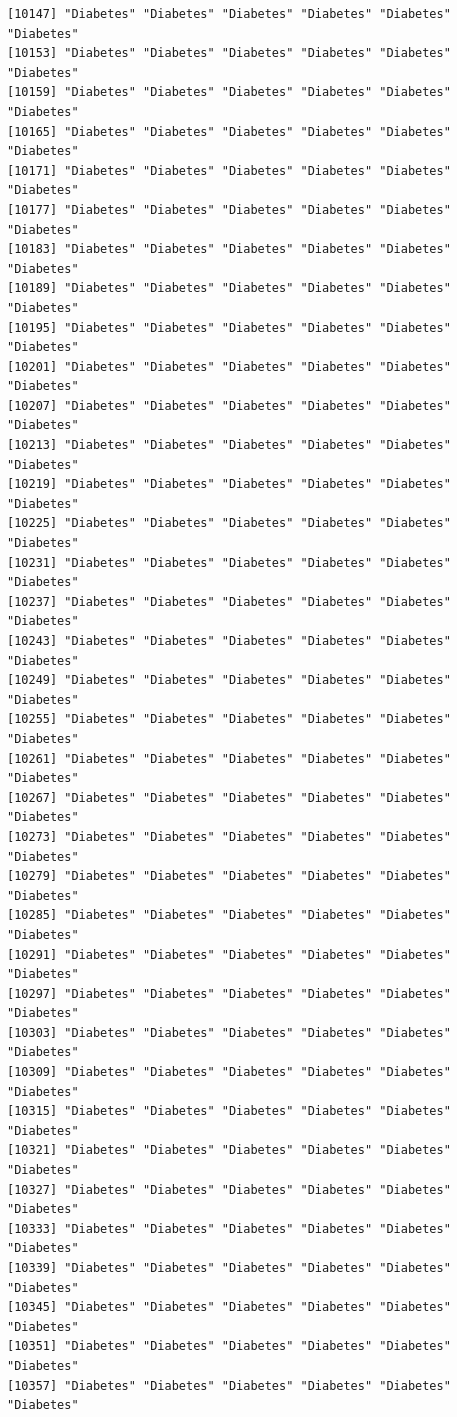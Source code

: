 \documentclass[
  letterpaper,
  DIV=11,
  numbers=noendperiod]{scrartcl}
\begin{document}
\begin{verbatim}
[10147] "Diabetes" "Diabetes" "Diabetes" "Diabetes" "Diabetes" "Diabetes"
[10153] "Diabetes" "Diabetes" "Diabetes" "Diabetes" "Diabetes" "Diabetes"
[10159] "Diabetes" "Diabetes" "Diabetes" "Diabetes" "Diabetes" "Diabetes"
[10165] "Diabetes" "Diabetes" "Diabetes" "Diabetes" "Diabetes" "Diabetes"
[10171] "Diabetes" "Diabetes" "Diabetes" "Diabetes" "Diabetes" "Diabetes"
[10177] "Diabetes" "Diabetes" "Diabetes" "Diabetes" "Diabetes" "Diabetes"
[10183] "Diabetes" "Diabetes" "Diabetes" "Diabetes" "Diabetes" "Diabetes"
[10189] "Diabetes" "Diabetes" "Diabetes" "Diabetes" "Diabetes" "Diabetes"
[10195] "Diabetes" "Diabetes" "Diabetes" "Diabetes" "Diabetes" "Diabetes"
[10201] "Diabetes" "Diabetes" "Diabetes" "Diabetes" "Diabetes" "Diabetes"
[10207] "Diabetes" "Diabetes" "Diabetes" "Diabetes" "Diabetes" "Diabetes"
[10213] "Diabetes" "Diabetes" "Diabetes" "Diabetes" "Diabetes" "Diabetes"
[10219] "Diabetes" "Diabetes" "Diabetes" "Diabetes" "Diabetes" "Diabetes"
[10225] "Diabetes" "Diabetes" "Diabetes" "Diabetes" "Diabetes" "Diabetes"
[10231] "Diabetes" "Diabetes" "Diabetes" "Diabetes" "Diabetes" "Diabetes"
[10237] "Diabetes" "Diabetes" "Diabetes" "Diabetes" "Diabetes" "Diabetes"
[10243] "Diabetes" "Diabetes" "Diabetes" "Diabetes" "Diabetes" "Diabetes"
[10249] "Diabetes" "Diabetes" "Diabetes" "Diabetes" "Diabetes" "Diabetes"
[10255] "Diabetes" "Diabetes" "Diabetes" "Diabetes" "Diabetes" "Diabetes"
[10261] "Diabetes" "Diabetes" "Diabetes" "Diabetes" "Diabetes" "Diabetes"
[10267] "Diabetes" "Diabetes" "Diabetes" "Diabetes" "Diabetes" "Diabetes"
[10273] "Diabetes" "Diabetes" "Diabetes" "Diabetes" "Diabetes" "Diabetes"
[10279] "Diabetes" "Diabetes" "Diabetes" "Diabetes" "Diabetes" "Diabetes"
[10285] "Diabetes" "Diabetes" "Diabetes" "Diabetes" "Diabetes" "Diabetes"
[10291] "Diabetes" "Diabetes" "Diabetes" "Diabetes" "Diabetes" "Diabetes"
[10297] "Diabetes" "Diabetes" "Diabetes" "Diabetes" "Diabetes" "Diabetes"
[10303] "Diabetes" "Diabetes" "Diabetes" "Diabetes" "Diabetes" "Diabetes"
[10309] "Diabetes" "Diabetes" "Diabetes" "Diabetes" "Diabetes" "Diabetes"
[10315] "Diabetes" "Diabetes" "Diabetes" "Diabetes" "Diabetes" "Diabetes"
[10321] "Diabetes" "Diabetes" "Diabetes" "Diabetes" "Diabetes" "Diabetes"
[10327] "Diabetes" "Diabetes" "Diabetes" "Diabetes" "Diabetes" "Diabetes"
[10333] "Diabetes" "Diabetes" "Diabetes" "Diabetes" "Diabetes" "Diabetes"
[10339] "Diabetes" "Diabetes" "Diabetes" "Diabetes" "Diabetes" "Diabetes"
[10345] "Diabetes" "Diabetes" "Diabetes" "Diabetes" "Diabetes" "Diabetes"
[10351] "Diabetes" "Diabetes" "Diabetes" "Diabetes" "Diabetes" "Diabetes"
[10357] "Diabetes" "Diabetes" "Diabetes" "Diabetes" "Diabetes" "Diabetes"

\end{verbatim}
\end{document}
